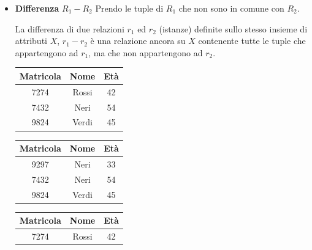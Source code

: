 \documentclass{article}
\begin{document}
\begin{itemize}
\begin{itemize}
        \item \textbf{Differenza} $R_1 - R_2$ Prendo le tuple di $R_1$ che non sono in comune con $R_2$.

        La differenza di due relazioni $r_1$ ed $r_2$ (istanze) definite sullo stesso insieme di attributi $X$, $r_1 - r_2$ è una relazione ancora su $X$ contenente tutte le tuple che appartengono ad $r_1$, ma che non appartengono ad $r_2$.

 \begin{minipage}{.2\textwidth}
  \centering
            \begin{tabular}{|c|c|c|}
                 \hline
                 \textbf{Matricola} & \textbf{Nome} & \textbf{Età} \\
                 \hline
                 7274 & Rossi & 42 \\
                 \hline
                 7432 & Neri & 54\\
                 \hline
                 9824 & Verdi & 45 \\
                 \hline
            \end{tabular}
\end{minipage}%
\hfill
\begin{minipage}{.2\textwidth}
  \centering
           \begin{tabular}{|c|c|c|}
                 \hline
                 \textbf{Matricola} & \textbf{Nome} & \textbf{Età} \\
                 \hline
                 9297 & Neri & 33 \\
                 \hline
                 7432 & Neri & 54\\
                 \hline
                 9824 & Verdi & 45 \\
                 \hline
            \end{tabular}
\hspace{1em}
\end{minipage}
\hfill
\begin{minipage}{.3\textwidth}
  \centering
           \begin{tabular}{|c|c|c|}
                 \hline
                 \textbf{Matricola} & \textbf{Nome} & \textbf{Età} \\
                 \hline
                 7274 & Rossi & 42 \\
                 \hline
            \end{tabular}
\hspace{1em}
\end{minipage}


\end{itemize}
\end{itemize}
\end{document}
